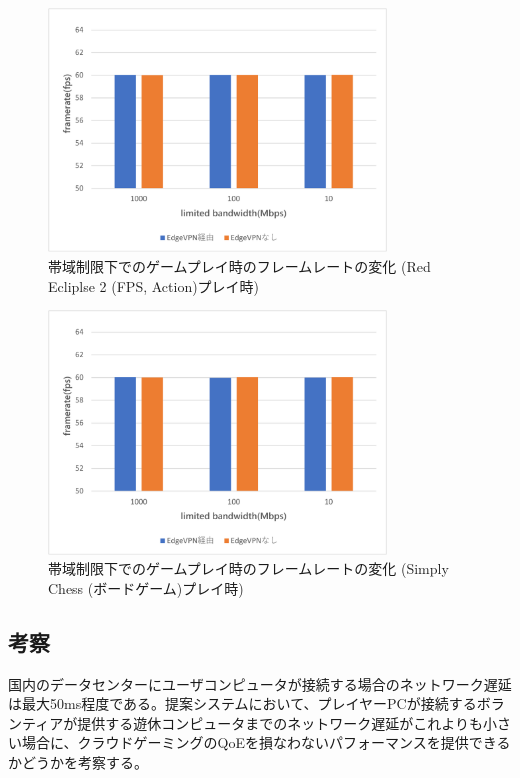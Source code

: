 \begin{figure}[t]
    \centering
    \includegraphics[width=0.8\textwidth,keepaspectratio,clip]{img/framerate_FPS.pdf}
    \caption{帯域制限下でのゲームプレイ時のフレームレートの変化 (Red Ecliplse 2 (FPS, Action)プレイ時)}
    \label{fig:fps_fps}
\end{figure}

\begin{figure}[t]
    \centering
    \includegraphics[width=0.8\textwidth,keepaspectratio,clip]{img/framerate_Board.pdf}
    \caption{帯域制限下でのゲームプレイ時のフレームレートの変化 (Simply Chess (ボードゲーム)プレイ時)}
    \label{fig:fps_board}
\end{figure}

\subsection{考察}
国内のデータセンターにユーザコンピュータが接続する場合のネットワーク遅延は最大50ms程度である。提案システムにおいて、プレイヤーPCが接続するボランティアが提供する遊休コンピュータまでのネットワーク遅延がこれよりも小さい場合に、クラウドゲーミングのQoEを損なわないパフォーマンスを提供できるかどうかを考察する。

